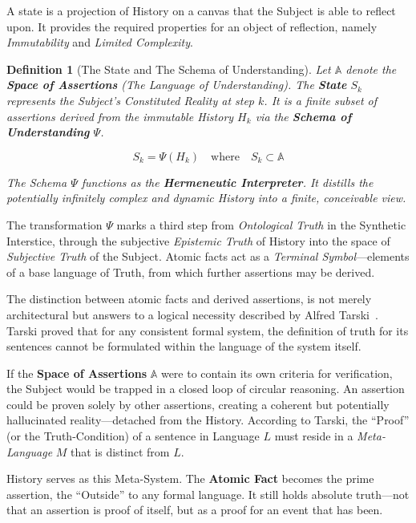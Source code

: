 \documentclass[11pt, a4paper]{article}
\theoremstyle{formalism}
\newtheorem{formalism}{Definition}
\begin{document}
A state is a projection of History on a canvas that the Subject is able to
reflect upon. It provides the required properties for an object of reflection,
namely {\it Immutability\/} and {\it Limited Complexity}.

\begin{formalism}[The State and The Schema of Understanding]

    Let $\mathbb{A}$ denote the \textbf{Space of Assertions} (The Language
    of Understanding). The \textbf{State} $S_k$ represents the Subject's
    \textit{Constituted Reality} at step $k$. It is a finite subset of
    assertions derived from the immutable History $H_k$ via the \textbf{Schema
    of Understanding} $\Psi$.

    \begin{equation}
        S_k = \Psi(H_k) \quad \text{where} \quad S_k \subset \mathbb{A}
    \end{equation}

    The Schema $\Psi$ functions as the \textbf{Hermeneutic Interpreter}. It
    distills the potentially infinitely complex and dynamic History into a
    finite, conceivable view. 

\end{formalism}

The transformation $\Psi$ marks a third step from {\it Ontological Truth\/} in
the Synthetic Interstice, through the subjective {\it Epistemic Truth\/} of
History into the space of {\it Subjective Truth\/} of the Subject. Atomic facts
act as a {\it Terminal Symbol\/}---elements of a base language of Truth,
from which further assertions may be derived.

The distinction between atomic facts and derived assertions, is not merely
architectural but answers to a logical necessity described by Alfred
Tarski~\cite{Tarski1933}. Tarski proved that for any consistent formal system,
the definition of truth for its sentences cannot be formulated within the
language of the system itself. 

If the \textbf{Space of Assertions} $\mathbb{A}$ were to contain its own
criteria for verification, the Subject would be trapped in a closed loop of
circular reasoning. An assertion could be proven solely by other assertions,
creating a coherent but potentially hallucinated reality---detached from the
History. According to Tarski, the ``Proof'' (or the Truth-Condition) of a
sentence in Language $L$ must reside in a \textit{Meta-Language} $M$ that
is distinct from $L$.

History serves as this Meta-System. The \textbf{Atomic Fact} becomes the prime
assertion, the ``Outside'' to any formal language. It still holds absolute
truth---not that an assertion is proof of itself, but as a proof for an event
that has been. 
\end{document}
